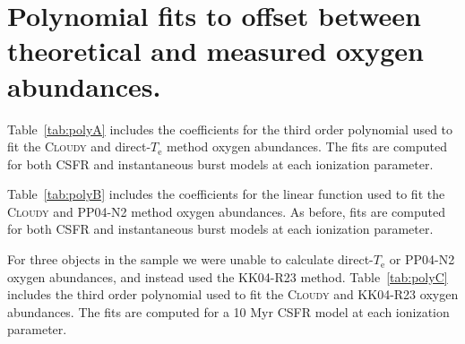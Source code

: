 \documentclass[trackchanges, preprint2]{aastex62}
\newcommand{\Cloudy}{\textsc{Cloudy}\xspace}
\newcommand{\Te}{\ensuremath{T_{\mathrm{e}}}\xspace}
\begin{document}


\appendix

\section{Polynomial fits to offset between theoretical and measured oxygen abundances.}\label{sec:appdx:poly}

Table~\ref{tab:polyA} includes the coefficients for the third order polynomial used to fit the \Cloudy and direct-\Te method oxygen abundances. The fits are computed for both CSFR and instantaneous burst models at each ionization parameter.

Table~\ref{tab:polyB} includes the coefficients for the linear function used to fit the \Cloudy and PP04-N2 method oxygen abundances. As before, fits are computed for both CSFR and instantaneous burst models at each ionization parameter.

For three objects in the sample we were unable to calculate direct-\Te or PP04-N2 oxygen abundances, and instead used the KK04-R23 method. Table~\ref{tab:polyC} includes the third order polynomial used to fit the \Cloudy and KK04-R23 oxygen abundances. The fits are computed for a 10 Myr CSFR model at each ionization parameter.
\end{document}

